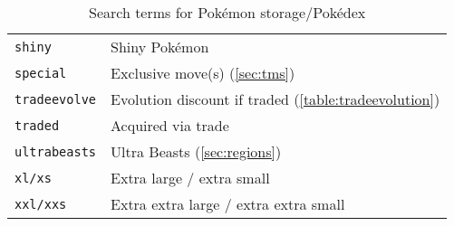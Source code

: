 \begin{table}
\begin{tabular}{ll}
\texttt{shiny} & Shiny Pokémon\\
\texttt{special} & Exclusive move(s) (\autoref{sec:tms})\\
\texttt{tradeevolve} & Evolution discount if traded (\autoref{table:tradeevolution})\\
\texttt{traded} & Acquired via trade\\
\texttt{ultrabeasts} & Ultra Beasts (\autoref{sec:regions})\\
\texttt{xl/xs} & Extra large / extra small\\
\texttt{xxl/xxs} & Extra extra large / extra extra small\\
\end{tabular}
  \caption{Search terms for Pokémon storage/Pokédex\label{table:searchterms}}
\end{table}
